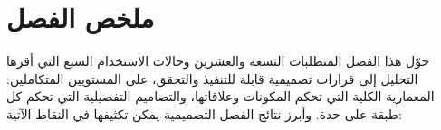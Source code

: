 %
%
\section{ملخص الفصل}
\label{sec:design-summary}

حوّل هذا الفصل المتطلبات التسعة والعشرين وحالات الاستخدام السبع التي أقرها التحليل إلى قرارات تصميمية قابلة للتنفيذ والتحقق، على المستويين المتكاملين: المعمارية الكلية التي تحكم المكونات وعلاقاتها، والتصاميم التفصيلية التي تحكم كل طبقة على حدة. وأبرز نتائج الفصل التصميمية يمكن تكثيفها في النقاط الآتية:

